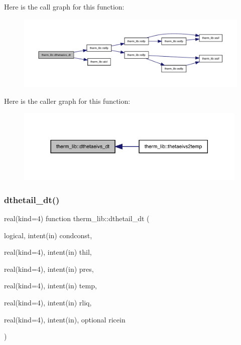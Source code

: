 Here is the call graph for this function\+:
\nopagebreak
\begin{figure}[H]
\begin{center}
\leavevmode
\includegraphics[width=350pt]{namespacetherm__lib_a2c2d9dff6ab1ea0e1385b7f94e322c26_cgraph}
\end{center}
\end{figure}
Here is the caller graph for this function\+:
\nopagebreak
\begin{figure}[H]
\begin{center}
\leavevmode
\includegraphics[width=314pt]{namespacetherm__lib_a2c2d9dff6ab1ea0e1385b7f94e322c26_icgraph}
\end{center}
\end{figure}
\mbox{\label{namespacetherm__lib_aece12bd6eb1571019dc09b9968d7e07e}} 
\subsubsection{\texorpdfstring{dthetail\+\_\+dt()}{dthetail\_dt()}}
{\footnotesize\ttfamily real(kind=4) function therm\+\_\+lib\+::dthetail\+\_\+dt (\begin{DoxyParamCaption}\item[{logical, intent(in)}]{condconst,  }\item[{real(kind=4), intent(in)}]{thil,  }\item[{real(kind=4), intent(in)}]{pres,  }\item[{real(kind=4), intent(in)}]{temp,  }\item[{real(kind=4), intent(in)}]{rliq,  }\item[{real(kind=4), intent(in), optional}]{ricein }\end{DoxyParamCaption})}

